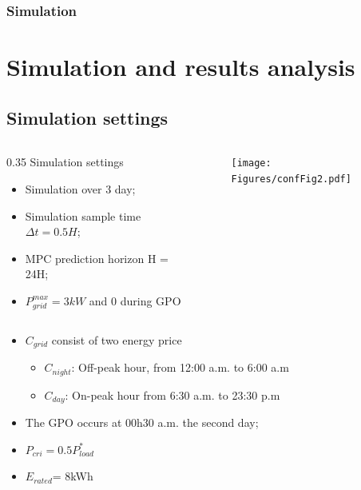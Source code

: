 \documentclass{beamer}
\begin{document}
\begingroup
\fontsize{10}{11}\selectfont
\begin{frame}
\frametitle{Simulation}
\section{Simulation and results analysis}
\subsection{Simulation settings}
\begin{columns}
    \begin{column} {0.35\textwidth}
        {\Large Simulation settings}
        \begin{itemize}
        \vspace{4pt}
            \item Simulation over 3 day;
            \vspace{3pt}
            \item Simulation sample time $\Delta t = 0.5H$;
            \vspace{3pt}
            \item MPC prediction horizon H = 24H;
            \vspace{3pt}
            \item $P_{grid}^{max}=3kW$ and 0 during GPO
            \end{itemize}
    \end{column}
    
    \begin{column}{0.65\textwidth}
                 
        \begin{figure}[!ht]
        \begin{center}
                \texttt{[image: Figures/confFig2.pdf]}
        \end{center}
        \label{Config1}
\end{figure}
        
    \end{column}
\end{columns}

\begin{itemize}
    \item  $C_{grid}$ consist of two energy price 
        \begin{itemize}
            \item $C_{night}$: Off-peak hour, from 12:00 a.m. to 6:00 a.m
            \item $C_{day}$: On-peak hour from 6:30 a.m. to 23:30 p.m
        \end{itemize}
    \item The GPO occurs at 00h30 a.m. the second day; 
    \item $P_{cri} = 0.5P_{load}^*$
    \item $E_{rated} $= 8kWh
    
\end{itemize}



\end{frame}
\endgroup
\end{document}
